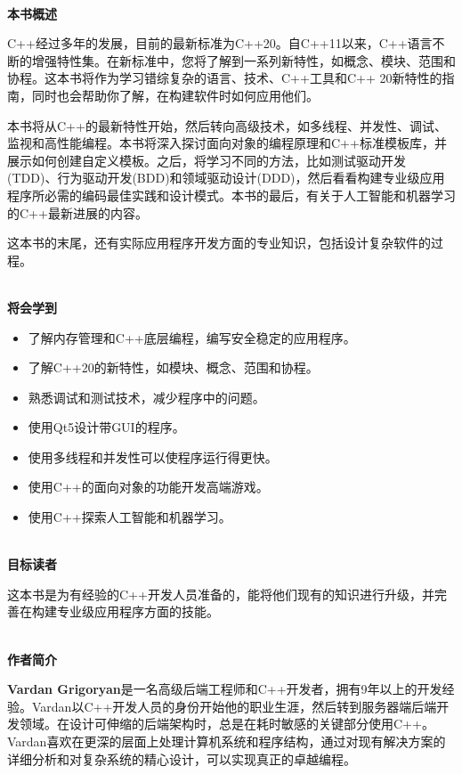 \documentclass[11pt,a4paper,UTF8]{ctexart}
\begin{document}
	\hspace*{\fill} \\ %
	\noindent\textbf{本书概述}\ \par
	C++经过多年的发展，目前的最新标准为C++20。自C++11以来，C++语言不断的增强特性集。在新标准中，您将了解到一系列新特性，如概念、模块、范围和协程。这本书将作为学习错综复杂的语言、技术、C++工具和C++ 20新特性的指南，同时也会帮助你了解，在构建软件时如何应用他们。\par
	
	本书将从C++的最新特性开始，然后转向高级技术，如多线程、并发性、调试、监视和高性能编程。本书将深入探讨面向对象的编程原理和C++标准模板库，并展示如何创建自定义模板。之后，将学习不同的方法，比如测试驱动开发(TDD)、行为驱动开发(BDD)和领域驱动设计(DDD)，然后看看构建专业级应用程序所必需的编码最佳实践和设计模式。本书的最后，有关于人工智能和机器学习的C++最新进展的内容。\par
	
	这本书的末尾，还有实际应用程序开发方面的专业知识，包括设计复杂软件的过程。\par
	
	\hspace*{\fill} \\ %
	\noindent\textbf{将会学到}\ \par
	\begin{itemize}
		\item 了解内存管理和C++底层编程，编写安全稳定的应用程序。
		\item 了解C++20的新特性，如模块、概念、范围和协程。
		\item 熟悉调试和测试技术，减少程序中的问题。
		\item 使用Qt5设计带GUI的程序。
		\item 使用多线程和并发性可以使程序运行得更快。
		\item 使用C++的面向对象的功能开发高端游戏。
		\item 使用C++探索人工智能和机器学习。
	\end{itemize}

	\hspace*{\fill} \\ %
	\noindent\textbf{目标读者}\ \par
	这本书是为有经验的C++开发人员准备的，能将他们现有的知识进行升级，并完善在构建专业级应用程序方面的技能。\par
	
	\hspace*{\fill} \\ %
	\noindent\textbf{作者简介}\ \par
	\textbf{Vardan Grigoryan}是一名高级后端工程师和C++开发者，拥有9年以上的开发经验。Vardan以C++开发人员的身份开始他的职业生涯，然后转到服务器端后端开发领域。在设计可伸缩的后端架构时，总是在耗时敏感的关键部分使用C++。Vardan喜欢在更深的层面上处理计算机系统和程序结构，通过对现有解决方案的详细分析和对复杂系统的精心设计，可以实现真正的卓越编程。\par
	
\end{document}

